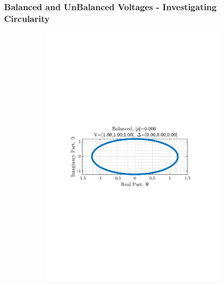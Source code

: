 \documentclass[12pt]{article}
\begin{document}
		\subsubsection{Balanced and UnBalanced Voltages - Investigating Circularity}
			\begin{figure}[H]
				\centering
				\begin{subfigure}{0.49\textwidth}
					\centering
					\includegraphics[trim={2.2cm 11.2cm 3.00cm  11.2cm}, clip, width=\textwidth]{../MATLAB/figures/q3_1c_fig01.pdf} 
					\captionsetup{justification=centering}
				\end{subfigure}
				\begin{subfigure}{0.49\textwidth}
					\centering

\end{subfigure}
\end{figure}
\end{document}
